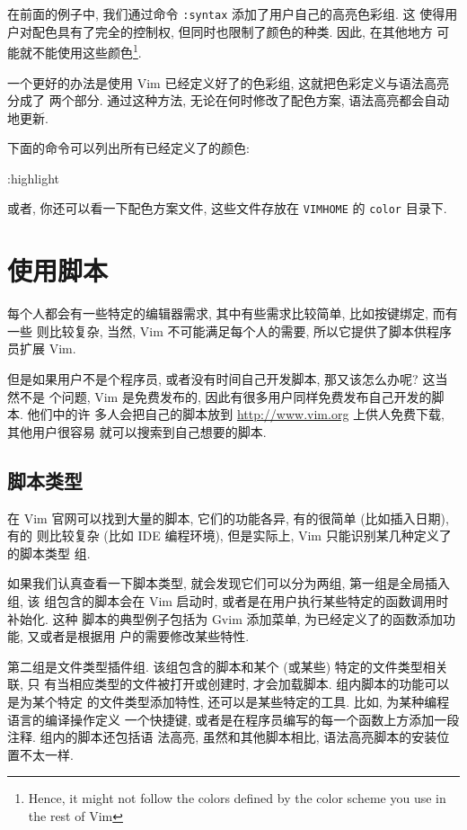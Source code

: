 在前面的例子中, 我们通过命令 \texttt{:syntax} 添加了用户自己的高亮色彩组. 这
使得用户对配色具有了完全的控制权, 但同时也限制了颜色的种类. 因此, 在其他地方
可能就不能使用这些颜色\footnote{Hence, it might not follow the colors defined
by the color scheme you use in the rest of Vim}.

一个更好的办法是使用 Vim 已经定义好了的色彩组, 这就把色彩定义与语法高亮分成了
两个部分. 通过这种方法, 无论在何时修改了配色方案, 语法高亮都会自动地更新.

下面的命令可以列出所有已经定义了的颜色:
\begin{vimcode}
:highlight
\end{vimcode}

\begin{warning}
    或者, 你还可以看一下配色方案文件, 这些文件存放在 \texttt{VIMHOME} 的
    \texttt{color} 目录下.
\end{warning}

\section{使用脚本}
\label{sec:using_scripts}

每个人都会有一些特定的编辑器需求, 其中有些需求比较简单, 比如按键绑定, 而有一些
则比较复杂, 当然, Vim 不可能满足每个人的需要, 所以它提供了脚本供程序员扩展
Vim.

但是如果用户不是个程序员, 或者没有时间自己开发脚本, 那又该怎么办呢? 这当然不是
个问题, Vim 是免费发布的, 因此有很多用户同样免费发布自己开发的脚本. 他们中的许
多人会把自己的脚本放到 \url{http://www.vim.org} 上供人免费下载, 其他用户很容易
就可以搜索到自己想要的脚本.

\subsection{脚本类型}
\label{subsec:script_types}

在 Vim 官网可以找到大量的脚本, 它们的功能各异, 有的很简单 (比如插入日期), 有的
则比较复杂 (比如 IDE 编程环境), 但是实际上, Vim 只能识别某几种定义了的脚本类型
组.

如果我们认真查看一下脚本类型, 就会发现它们可以分为两组, 第一组是全局插入组, 该
组包含的脚本会在 Vim 启动时, 或者是在用户执行某些特定的函数调用时补始化. 这种
脚本的典型例子包括为 Gvim 添加菜单, 为已经定义了的函数添加功能, 又或者是根据用
户的需要修改某些特性.

第二组是文件类型插件组. 该组包含的脚本和某个 (或某些) 特定的文件类型相关联, 只
有当相应类型的文件被打开或创建时, 才会加载脚本. 组内脚本的功能可以是为某个特定
的文件类型添加特性, 还可以是某些特定的工具. 比如, 为某种编程语言的编译操作定义
一个快捷键, 或者是在程序员编写的每一个函数上方添加一段注释. 组内的脚本还包括语
法高亮, 虽然和其他脚本相比, 语法高亮脚本的安装位置不太一样.

